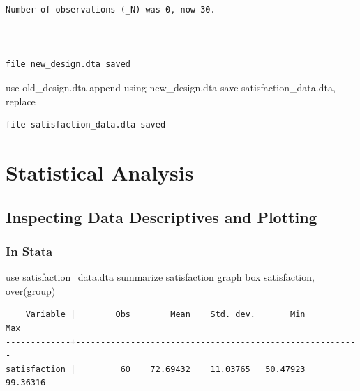 \documentclass[
  letterpaper,
  DIV=11,
  numbers=noendperiod]{scrreprt}
\newenvironment{Shaded}{\begin{snugshade}}{\end{snugshade}}
\newcommand{\BaseNTok}[1]{\textcolor[rgb]{0.68,0.00,0.00}{#1}}
\newcommand{\FunctionTok}[1]{\textcolor[rgb]{0.28,0.35,0.67}{#1}}
\newcommand{\KeywordTok}[1]{\textcolor[rgb]{0.00,0.23,0.31}{#1}}
\newcommand{\NormalTok}[1]{\textcolor[rgb]{0.00,0.23,0.31}{#1}}
\begin{document}
\begin{verbatim}
Number of observations (_N) was 0, now 30.



file new_design.dta saved
\end{verbatim}

\begin{Shaded}
\begin{Highlighting}[]
\KeywordTok{use}\NormalTok{ old\_design.dta}
\KeywordTok{append} \KeywordTok{using}\NormalTok{ new\_design.dta}
\KeywordTok{save}\NormalTok{ satisfaction\_data.dta, }\KeywordTok{replace}
\end{Highlighting}
\end{Shaded}

\begin{verbatim}
file satisfaction_data.dta saved
\end{verbatim}

\section{Statistical Analysis}\label{statistical-analysis}

\subsection{Inspecting Data Descriptives and
Plotting}\label{inspecting-data-descriptives-and-plotting}

\subsubsection{In Stata}\label{in-stata-1}

\begin{Shaded}
\begin{Highlighting}[]
\KeywordTok{use}\NormalTok{ satisfaction\_data.dta}
\KeywordTok{summarize}\NormalTok{ satisfaction}
\KeywordTok{graph}\NormalTok{ box satisfaction, }\BaseNTok{over}\NormalTok{(}\FunctionTok{group}\NormalTok{)}
\end{Highlighting}
\end{Shaded}

\begin{verbatim}
    Variable |        Obs        Mean    Std. dev.       Min        Max
-------------+---------------------------------------------------------
satisfaction |         60    72.69432    11.03765   50.47923   99.36316
\end{verbatim}
\end{document}
